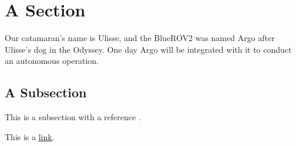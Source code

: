 \section{A Section}

Our catamaran's name is Ulisse, and the BlueROV2 was named Argo after Ulisse's dog in the Odyssey. One day Argo will be integrated with it to conduct an autonomous operation.


\subsection{A Subsection}

This is a subsection with a reference \cite{bluerov2_datasheet}.

This is a \href{https://theuselessweb.com/}{link}.